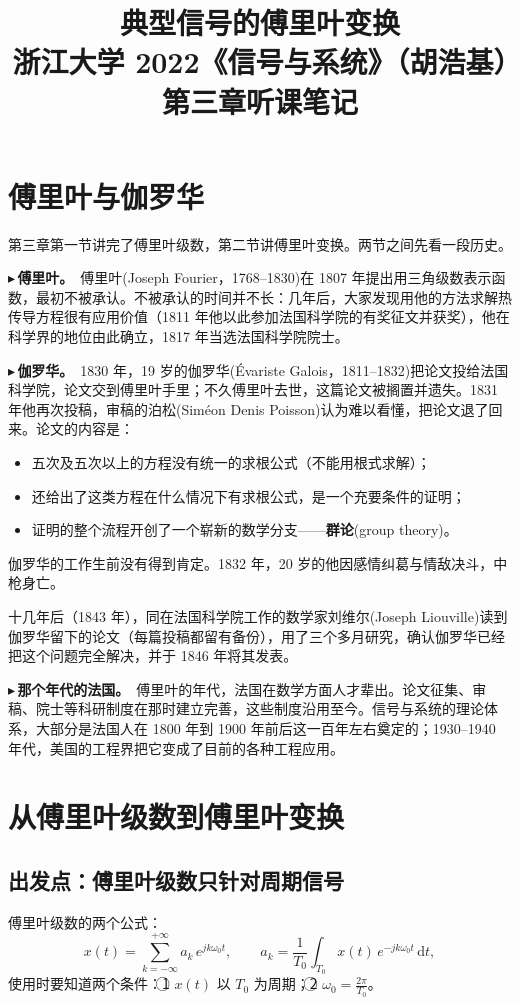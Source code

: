 \documentclass[UTF8,a4paper,11pt]{ctexart}
\title{典型信号的傅里叶变换\\\large 浙江大学 2022《信号与系统》（胡浩基）第三章听课笔记}
\author{}
\date{}
\newcommand{\dd}{\mathrm{d}}
\newcounter{ex}[section]
\newcommand{\point}[1]{\par\addvspace{1ex}\noindent\textcolor{ptteal}{$\blacktriangleright$\,\textbf{#1}}\ }
\begin{document}
\pagestyle{plain}
\maketitle

\section{傅里叶与伽罗华}\label{sec:history}
第三章第一节讲完了傅里叶级数，第二节讲傅里叶变换。两节之间先看一段历史。

\point{傅里叶。}傅里叶(Joseph Fourier，1768--1830)在 1807 年提出用三角级数表示函数，最初不被承认。不被承认的时间并不长：几年后，大家发现用他的方法求解热传导方程很有应用价值（1811 年他以此参加法国科学院的有奖征文并获奖），他在科学界的地位由此确立，1817 年当选法国科学院院士。

\point{伽罗华。}1830 年，19 岁的伽罗华(Évariste Galois，1811--1832)把论文投给法国科学院，论文交到傅里叶手里；不久傅里叶去世，这篇论文被搁置并遗失。1831 年他再次投稿，审稿的泊松(Siméon Denis Poisson)认为难以看懂，把论文退了回来。论文的内容是：
\begin{itemize}[nosep]
\item 五次及五次以上的方程没有统一的求根公式（不能用根式求解）；
\item 还给出了这类方程在什么情况下有求根公式，是一个充要条件的证明；
\item 证明的整个流程开创了一个崭新的数学分支——\textbf{群论}(group theory)。
\end{itemize}
伽罗华的工作生前没有得到肯定。1832 年，20 岁的他因感情纠葛与情敌决斗，中枪身亡。

十几年后（1843 年），同在法国科学院工作的数学家刘维尔(Joseph Liouville)读到伽罗华留下的论文（每篇投稿都留有备份），用了三个多月研究，确认伽罗华已经把这个问题完全解决，并于 1846 年将其发表。

\point{那个年代的法国。}傅里叶的年代，法国在数学方面人才辈出。论文征集、审稿、院士等科研制度在那时建立完善，这些制度沿用至今。信号与系统的理论体系，大部分是法国人在 1800 年到 1900 年前后这一百年左右奠定的；1930--1940 年代，美国的工程界把它变成了目前的各种工程应用。

\section{从傅里叶级数到傅里叶变换}\label{sec:derive}
\subsection{出发点：傅里叶级数只针对周期信号}
傅里叶级数的两个公式：
\[
x(t)=\sum_{k=-\infty}^{+\infty}a_k\,e^{jk\omega_0t},\qquad
a_k=\frac1{T_0}\int_{T_0}x(t)\,e^{-jk\omega_0t}\,\dd t ,
\]
使用时要知道两个条件：\textcircled{\scriptsize 1} $x(t)$ 以 $T_0$ 为周期；\textcircled{\scriptsize 2} $\omega_0=\frac{2\pi}{T_0}$。
\end{document}
